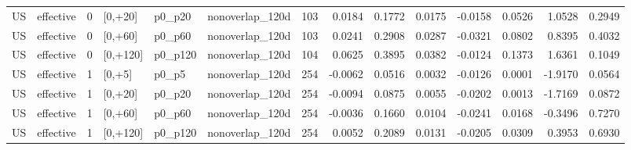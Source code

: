 \begin{tabular}{llrlllrrrrrrrr}
US & effective & 0 & [0,+20] & p0_p20 & nonoverlap_120d & 103 & 0.0184 & 0.1772 & 0.0175 & -0.0158 & 0.0526 & 1.0528 & 0.2949 \\
US & effective & 0 & [0,+60] & p0_p60 & nonoverlap_120d & 103 & 0.0241 & 0.2908 & 0.0287 & -0.0321 & 0.0802 & 0.8395 & 0.4032 \\
US & effective & 0 & [0,+120] & p0_p120 & nonoverlap_120d & 104 & 0.0625 & 0.3895 & 0.0382 & -0.0124 & 0.1373 & 1.6361 & 0.1049 \\
US & effective & 1 & [0,+5] & p0_p5 & nonoverlap_120d & 254 & -0.0062 & 0.0516 & 0.0032 & -0.0126 & 0.0001 & -1.9170 & 0.0564 \\
US & effective & 1 & [0,+20] & p0_p20 & nonoverlap_120d & 254 & -0.0094 & 0.0875 & 0.0055 & -0.0202 & 0.0013 & -1.7169 & 0.0872 \\
US & effective & 1 & [0,+60] & p0_p60 & nonoverlap_120d & 254 & -0.0036 & 0.1660 & 0.0104 & -0.0241 & 0.0168 & -0.3496 & 0.7270 \\
US & effective & 1 & [0,+120] & p0_p120 & nonoverlap_120d & 254 & 0.0052 & 0.2089 & 0.0131 & -0.0205 & 0.0309 & 0.3953 & 0.6930 \\
\bottomrule
\end{tabular}

